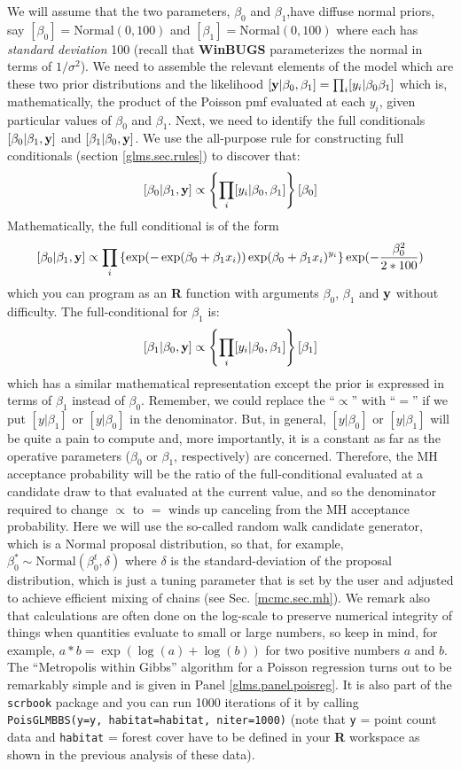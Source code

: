 {We will assume that the two parameters, $\beta_0$ and $\beta_1$,have diffuse
normal priors, say $[\beta_0] = \mbox{Normal}(0,100)$ and
$[\beta_1]=\mbox{Normal}(0,100)$ where each has {\it standard deviation}
100 (recall that {\bf WinBUGS} parameterizes the normal in terms of $1/\sigma^{2}$).
We need to assemble the relevant elements of the model which are these
two prior distributions and the
likelihood $[{\bf y}|\beta_0,\beta_1] = \prod_{i} [y_i|\beta_0 \beta_1] $ which is,
mathematically, the product of the Poisson pmf evaluated at each $y_i$,
given particular values of $\beta_0$ and $\beta_1$.
Next, we need to identify the full conditionals
$[\beta_0|\beta_1, {\bf y}]$ and $[\beta_1|\beta_0,{\bf y}]$.  We use the all-purpose
rule for constructing full conditionals
(section \ref{glms.sec.rules})
 to discover that:
\[
 [\beta_0|\beta_1,{\bf y}] \propto \left\{ \prod_{i} [y_{i}|\beta_0,\beta_1]\right\}[\beta_0]
\]
Mathematically, the full conditional is of the form
\[
 [\beta_0|\beta_1,{\bf y}] \propto
\prod_{i} \left\{
\exp(-\exp(\beta_{0} + \beta_{1} x_{i}))
\exp(\beta_{0} + \beta_{1} x_{i})^{y_{i}}
\right\}
\exp(-\frac{\beta_{0}^2}{2*100})
\]
which you can program as an {\bf R} function with arguments
$\beta_{0}$, $\beta_{1}$ and ${\bf y}$ without difficulty.
The full-conditional for $\beta_{1}$ is:
\[
 [\beta_1|\beta_0,{\bf y}] \propto \left\{ \prod_{i}
   [y_{i}|\beta_0,\beta_1]\right\} [\beta_1]
\]
which has a similar mathematical representation except the prior is
expressed in terms of $\beta_{1}$ instead of $\beta_{0}$.
Remember, we could replace the ``$\propto$'' with ``$=$'' if we
put $[y|\beta_1]$ or $[y|\beta_0]$ in the denominator. But, in general,
$[y|\beta_0]$ or $[y|\beta_1]$ will be quite a pain to compute and, more
importantly, it is a constant as far as the operative parameters
($\beta_0$ or $\beta_1$,
respectively) are concerned. Therefore,
the MH acceptance probability will be the ratio of the
full-conditional evaluated at a candidate draw to that evaluated at the
current value, and so the denominator required to change $\propto$ to $=$
winds up canceling from the MH acceptance probability.
Here we will
use the so-called random walk candidate generator, which is a Normal proposal distribution, so that, for example,
 $\beta_0^{*} \sim \mbox{Normal}(\beta_0^{t},\delta)$ where $\delta$ is
 the standard-deviation of the proposal distribution, which is just a
 tuning parameter that is set by the user and adjusted to achieve
 efficient mixing of chains (see Sec. \ref{mcmc.sec.mh}).
We remark also that calculations are often done on the log-scale to
preserve numerical integrity of things when quantities evaluate to
small or large numbers, so keep in mind, for example,
$a*b = \exp(\log(a) + \log(b))$ for two positive numbers $a$ and $b$.
 The ``Metropolis within
Gibbs'' algorithm for a Poisson regression turns out to be remarkably
simple and is given in Panel \ref{glms.panel.poisreg}. It is also part
of the {\tt scrbook} package and you can run 1000 iterations of it by
calling {\tt PoisGLMBBS(y=y, habitat=habitat, niter=1000)} (note that
{\tt y} = point count data and {\tt habitat} = forest cover have to
be defined in your {\bf R} workspace as shown in  the previous
analysis of these data).

}
